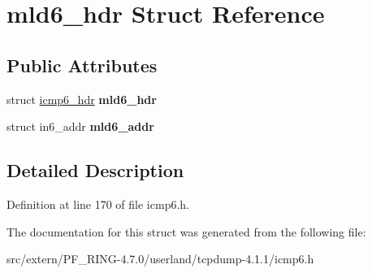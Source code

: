 \hypertarget{structmld6__hdr}{
\section{mld6\_\-hdr Struct Reference}
\label{structmld6__hdr}
}
\subsection*{Public Attributes}
\begin{DoxyCompactItemize}
\item 
\hypertarget{structmld6__hdr_abd9157d7e25310f766821befc3ee79ca}{
struct \hyperlink{structicmp6__hdr}{icmp6\_\-hdr} {\bfseries mld6\_\-hdr}}
\label{structmld6__hdr_abd9157d7e25310f766821befc3ee79ca}

\item 
\hypertarget{structmld6__hdr_a0a7baea83a6c3eb8b7e30abfffceb9c4}{
struct in6\_\-addr {\bfseries mld6\_\-addr}}
\label{structmld6__hdr_a0a7baea83a6c3eb8b7e30abfffceb9c4}

\end{DoxyCompactItemize}


\subsection{Detailed Description}


Definition at line 170 of file icmp6.h.



The documentation for this struct was generated from the following file:\begin{DoxyCompactItemize}
\item 
src/extern/PF\_\-RING-\/4.7.0/userland/tcpdump-\/4.1.1/icmp6.h\end{DoxyCompactItemize}
